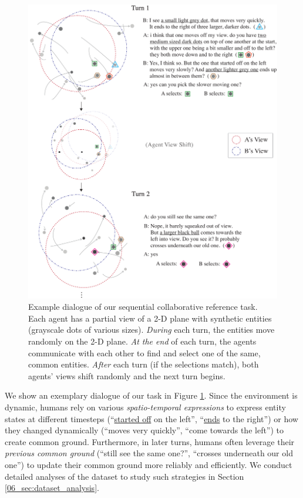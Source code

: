 \begin{figure}[tb!]
\centering
\includegraphics[width=\textwidth]{first_example.pdf}
\caption{Example dialogue of our sequential collaborative reference task. Each agent has a partial view of a 2-D plane with synthetic entities (grayscale dots of various sizes). \textit{During} each turn, the entities move randomly on the 2-D plane. \textit{At the end} of each turn, the agents communicate with each other to find and select one of the same, common entities. \textit{After} each turn (if the selections match), both agents' views shift randomly and the next turn begins.
}
\label{06_fig:first_example}
\end{figure}

We show an exemplary dialogue of our task in Figure \ref{06_fig:first_example}. Since the environment is dynamic, humans rely on various \textit{spatio-temporal expressions} to express entity states at different timesteps (``\underline{started off} on the left'', ``\underline{ends} to the right'') or how they changed dynamically (``moves very quickly'', ``come towards the left'') to create common ground. Furthermore, in later turns, humans often leverage their \textit{previous common ground} (``still see the same one?'', ``crosses underneath our old one'') to update their common ground more reliably and efficiently. We conduct detailed analyses of the dataset to study such strategies in Section \ref{06_sec:dataset_analysis}.

